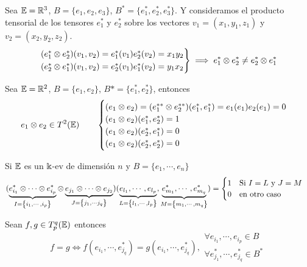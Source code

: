 \begin{example}
    Sea $\mathbb{E} = \mathbb{R}^3$, $B = \{e_1, e_2, e_3\}$, $B^* = \{ e_1^*, e_2^*, e_3^*\}$.
    Y consideramos el producto tensorial de los tensores $e_1^*$ y $e_2^*$ sobre
    los vectores $v_1 = (x_1, y_1, z_1)$ y $v_2 = (x_2,y_2,z_2)$.
    \[
        \begin{rcases}
            (e_1^* \otimes e_2^*)(v_1, v_2) = e_1^*(v_1)e_2^*(v_2) = x_1y_2 \\
            (e_2^* \otimes e_1^*)(v_1, v_2) = e_2^*(v_1)e_1^*(v_2) = y_1x_2
        \end{rcases}
        \implies e_1^* \otimes e_2^* \neq e_2^* \otimes e_1^*
    \]
\end{example}
\begin{example}
    Sea $\mathbb{E} = \mathbb{R}^2$, $B = \{e_1, e_2\}$, $B* = \{e_1^*, e_2^*\}$, entonces
    \[
        e_1 \otimes e_2 \in T^2(\mathbb{E}) \qquad \begin{cases}
            (e_1 \otimes e_2) = (e_1^{**} \otimes e_2^{**})(e_1^*,e_1^*) =
            e_1(e_1)e_2(e_1) = 0 \\
            (e_1 \otimes e_2)(e_1^*,e_2^*) = 1 \\
            (e_1 \otimes e_2)(e_2^*,e_1^*) = 0 \\
            (e_1 \otimes e_2)(e_2^*,e_2^*) = 0
        \end{cases}
    \]
\end{example}
\begin{obs} \label{obs:tens_cero}
    Si $\mathbb{E}$ es un $\Bbbk$-ev de dimensión $n$ y $B = \{e_1, \cdots, e_n\}$
    \[
        (\underbrace{e_{i_1}^* \otimes \cdots \otimes e_{i_p}^*}_
        {I = \left\{i_1, \cdots, i_p\right\}} \otimes
        \underbrace{e_{j_1} \otimes \cdots \otimes e_{j_2}}_
        {J = \left\{j_1, \cdots j_q\right\}})(\underbrace{e_{l_1}, \cdots, e_{l_p}}_
        {L = \left\{l_1, \cdots, l_p\right\}}, \underbrace{e_{m_1}^*, \cdots, e_{m_q}^*}_
        {M = \left\{m_1, \cdots, m_q\right\}}) =
        \begin{cases}
            1 \quad \text{Si } I = L \text{ y } J = M \\
            0 \quad \text{en otro caso}
        \end{cases}
    \]
\end{obs}
\begin{obs}
    Sean $f,g \in T_p^q(\mathbb{E})$ entonces
    \[
        f=g \iff f(e_{i_1}, \cdots, e_{j_q}^*) = g(e_{i_1}, \cdots, e_{j_q}^*), 
        \begin{array}{l}
            \forall e_{i_1}, \cdots, e_{i_p} \in B \\
            \forall e_{j_1}^*, \cdots,e_{j_q}^* \in B^*
        \end{array}
    \]
\end{obs}


